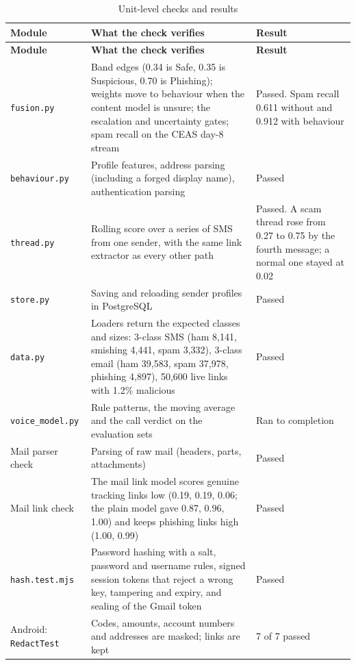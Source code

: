 {{\small{}
\begin{longtable}{|p{3.0cm}|p{7.6cm}|p{3.4cm}|}
\caption{Unit-level checks and results}\label{tab:unit}\\
\hline \textbf{Module} & \textbf{What the check verifies} & \textbf{Result} \\ \hline
\endfirsthead
\hline \textbf{Module} & \textbf{What the check verifies} & \textbf{Result} \\ \hline
\endhead
\hline
\endfoot
\texttt{fusion.py} & Band edges (0.34 is Safe, 0.35 is Suspicious, 0.70 is Phishing); weights move to behaviour when the content model is unsure; the escalation and uncertainty gates; spam recall on the CEAS day-8 stream & Passed. Spam recall 0.611 without and 0.912 with behaviour \\ \hline
\texttt{behaviour.py} & Profile features, address parsing (including a forged display name), authentication parsing & Passed \\ \hline
\texttt{thread.py} & Rolling score over a series of SMS from one sender, with the same link extractor as every other path & Passed. A scam thread rose from 0.27 to 0.75 by the fourth message; a normal one stayed at 0.02 \\ \hline
\texttt{store.py} & Saving and reloading sender profiles in PostgreSQL & Passed \\ \hline
\texttt{data.py} & Loaders return the expected classes and sizes: 3-class SMS (ham 8{,}141, smishing 4{,}441, spam 3{,}332), 3-class email (ham 39{,}583, spam 37{,}978, phishing 4{,}897), 50{,}600 live links with 1.2\% malicious & Passed \\ \hline
\texttt{voice\_model.py} & Rule patterns, the moving average and the call verdict on the evaluation sets & Ran to completion \\ \hline
Mail parser check & Parsing of raw mail (headers, parts, attachments) & Passed \\ \hline
Mail link check & The mail link model scores genuine tracking links low (0.19, 0.19, 0.06; the plain model gave 0.87, 0.96, 1.00) and keeps phishing links high (1.00, 0.99) & Passed \\ \hline
\texttt{hash.test.mjs} & Password hashing with a salt, password and username rules, signed session tokens that reject a wrong key, tampering and expiry, and sealing of the Gmail token & Passed \\ \hline
Android: \texttt{RedactTest} & Codes, amounts, account numbers and addresses are masked; links are kept & 7 of 7 passed \\ \hline

\end{longtable}}}
